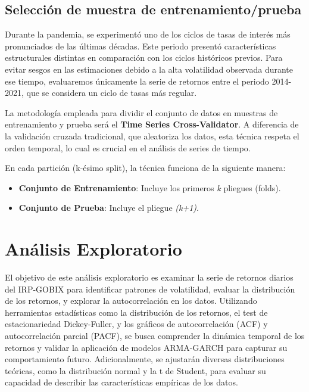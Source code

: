 \documentclass[
  number,
  preprint,
  3p,
  onecolumn]{elsarticle}
\providecommand{\tightlist}{%
  \setlength{\itemsep}{0pt}\setlength{\parskip}{0pt}}\usepackage{longtable,booktabs,array}
\begin{document}
\subsection{Selección de muestra de
entrenamiento/prueba}\label{sec-test-train}

Durante la pandemia, se experimentó uno de los ciclos de tasas de
interés más pronunciados de las últimas décadas. Este periodo presentó
características estructurales distintas en comparación con los ciclos
históricos previos. Para evitar sesgos en las estimaciones debido a la
alta volatilidad observada durante ese tiempo, evaluaremos únicamente la
serie de retornos entre el periodo 2014-2021, que se considera un ciclo
de tasas más regular.

La metodología empleada para dividir el conjunto de datos en muestras de
entrenamiento y prueba será el \textbf{Time Series Cross-Validator}. A
diferencia de la validación cruzada tradicional, que aleatoriza los
datos, esta técnica respeta el orden temporal, lo cual es crucial en el
análisis de series de tiempo.

En cada partición (k-ésimo split), la técnica funciona de la siguiente
manera:

\begin{itemize}
\tightlist
\item
  \textbf{Conjunto de Entrenamiento}: Incluye los primeros \emph{k}
  pliegues (folds).
\item
  \textbf{Conjunto de Prueba}: Incluye el pliegue \emph{(k+1)}.
\end{itemize}

\section{Análisis Exploratorio}\label{sec-eda}

El objetivo de este análisis exploratorio es examinar la serie de
retornos diarios del IRP-GOBIX para identificar patrones de volatilidad,
evaluar la distribución de los retornos, y explorar la autocorrelación
en los datos. Utilizando herramientas estadísticas como la distribución
de los retornos, el test de estacionariedad Dickey-Fuller, y los
gráficos de autocorrelación (ACF) y autocorrelación parcial (PACF), se
busca comprender la dinámica temporal de los retornos y validar la
aplicación de modelos ARMA-GARCH para capturar su comportamiento futuro.
Adicionalmente, se ajustarán diversas distribuciones teóricas, como la
distribución normal y la t de Student, para evaluar su capacidad de
describir las características empíricas de los datos.
\end{document}
